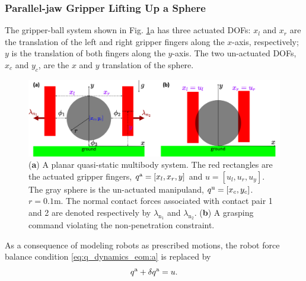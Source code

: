 \subsubsection{Parallel-jaw Gripper Lifting Up a Sphere}
The gripper-ball system shown in Fig. \ref{fig:gripper_ball_schematics}a has three actuated DOFs: $x_l$ and $x_r$ are the translation of the left and right gripper fingers along the $x$-axis, respectively; $y$ is the translation of both fingers along the $y$-axis. The two un-actuated DOFs, $x_c$ and $y_c$, are the $x$ and $y$ translation of the sphere.
\begin{figure}
\centering
\includegraphics[width=1.0\linewidth]{figures/02_quasi_static_dynamics/gripper_ball_schematics.png}
\caption{(\textbf{a}) A planar quasi-static multibody system. The red rectangles are the actuated gripper fingers, ${q^\mathrm{a}}= [x_l, x_r, y]$ and $u = [u_l, u_r, u_y]$. The gray sphere is the un-actuated manipuland, ${q^\mathrm{u}} = [x_c, y_c]$. $r=0.1\mathrm{m}$. The normal contact forces associated with contact pair 1 and 2 are denoted respectively by $\lambda_{\mathrm{n}_1}$ and $\lambda_{\mathrm{n}_2}$. (\textbf{b}) A grasping command violating the non-penetration constraint.}
\label{fig:gripper_ball_schematics}
\end{figure}

As a consequence of modeling robots as prescribed motions, the robot force balance condition \eqref{eq:q_dynamics_eom:a} is replaced by 
\begin{equation}
\label{eq:naive_quasi_static_robot_motion}
{q^\mathrm{a}} + \delta {q^\mathrm{a}} = u.
\end{equation}

